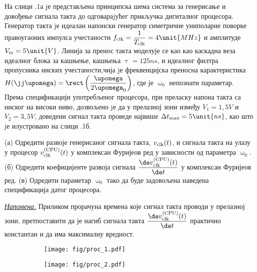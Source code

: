 \mnDifficult
    \noindent\PID
    На слици \ID.1а jе представљена принципска шема система за
    генерисање и довођење сигнала такта до одговараjућег прикључка
    дигиталног процесора. Генератор такта jе идеалан напонски
    генератор симетричне униполарне поворке правоугаоних импулса
    учестаности
    $f_{\rm clk} = \dfrac{1}{T_{\rm clk}} = 4\unit{MHz}$
    и амплитуде $V_{\rm m} = 5\unit{V}$. 
    Линија за пренос такта моделује се као као каскадна
    веза идеалног блока за кашњење, кашњења 
    $\uptau = 125\unit{ns}$, и идеалног филтра пропусника ниских учестаности,чија
    jе фреквенцијска преносна карактеристика 
    $H(\jj\upomega) = \rect\left( \dfrac{\upomega}{2\upomega_0} \right)$, где је 
    $\upomega_0$ непознати параметар. 
    Према спецификацији употребљеног процесора, при
    преласку напона такта са ниског на високи ниво, дозвољено jе
    да у прелазној зони између $V_1 = 1,5\unit{V}$ и $V_2 = 3,5\unit{V}$, доведени сигнал такта
    проведе највише 
    $\Delta t_{\rm max} = 5\unit{ns}$, као што jе илустровано на слици \ID.1б. 

    (а) Одредити развоје генерисаног сигнала такта, $v_{\rm clk}(t)$, и сигнала такта
    на улазу у процесор $v_{\rm clk}^{\rm(CPU)}(t)$ у комплексан Фуријеов ред у зависности 
    од параметра $\upomega_0$.
    (б) Одредити коефицијенте развоја сигнала $\dfrac{\de v_{\rm clk}^{\rm (CPU)}(t)}{\de t}$ 
    у комплексан Фуријеов ред.  
    (в) Одредити параметар $\upomega_0$ тако да буде задовољена наведена спецификација датог 
    процесора. 

    \underline{\it Напомена.} Приликом прорачуна времена које сигнал такта проводи у 
    прелазној зони, претпоставити да је нагиб сигнала такта 
    $\dfrac{\de v_{\rm clk}^{\rm (CPU)}(t)}{\de t}$ практично константан и да има максималну 
    вредност. \\

    \begin{figure}[ht!]
        \begin{subfigure}{0.5\textwidth}
            \centering
            \texttt{[image: fig/proc\_1.pdf]}
            \caption{}
        \end{subfigure}
        \begin{subfigure}{0.5\textwidth}
            \centering
            \texttt{[image: fig/proc\_2.pdf]}
            \caption{}
        \end{subfigure}
        \caption{}
    \end{figure}


